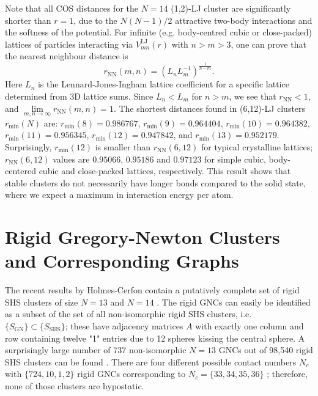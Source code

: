 Note that all \ac{COS} distances for the $N=14$ (1,2)-\ac{LJ} cluster are
significantly shorter than $r=1$, due to the $N(N-1)/2$ attractive two-body
interactions and the softness of the potential.  For infinite (e.g.
body-centred cubic or close-packed) lattices of particles interacting via
$V^\mathrm{LJ}_{mn}(r)$ with $n> m >3$, one can prove
\autocite{Schwerdtfeger_ExtensionLennardJonespotential_2006} that the nearest
neighbour distance is
%
\begin{equation}
    r_\mathrm{NN}(m,n)=\left( L_n L_m^{-1}\right)^\frac{1}{n-m}. %
    \label{eqn:lattice}
\end{equation}%
%
Here $L_n$ is the Lennard-Jones-Ingham lattice coefficient for a specific
lattice determined from 3D lattice sums.  Since $L_n<L_m$ for $n>m$, we see
that $r_\mathrm{NN}<1$, and $\lim\limits_{m,n\rightarrow
\infty}r_\mathrm{NN}(m,n)=1$.  The shortest distances found in (6,12)-\ac{LJ}
clusters $r_\text{min}(N)$ are: $r_\text{min}(8)=0.986767$,
$r_\text{min}(9)=0.964404$, $r_\text{min}(10)=0.964382$,
$r_\text{min}(11)=0.956345$, $r_\text{min}(12)=0.947842$, and
$r_\text{min}(13)=0.952179$.  Surprisingly, $r_\text{min}(12)$ is smaller than
$r_\mathrm{NN}(6,12)$ for typical crystalline lattices; $r_\mathrm{NN}(6,12)$
values are $0.95066$, $0.95186$ and $0.97123$ for simple cubic, body-centered
cubic and close-packed lattices, respectively.  This result shows that stable
clusters do not necessarily have longer bonds compared to the solid state,
where we expect a maximum in interaction energy per atom.

\section{Rigid Gregory-Newton Clusters and Corresponding Graphs}

The recent results by Holmes-Cerfon contain a putatively complete set of rigid
SHS clusters of size $N=13$ and $N=14$
\autocite{Holmes-Cerfon_EnumeratingRigidSphere_2016}. The rigid GNCs can easily
be identified as a subset of the set of all non-isomorphic rigid SHS clusters,
i.e. $\{ S_\mathrm{GN}\}\subset \{ S_\mathrm{SHS}\}$; these have adjacency
matrices $A$ with exactly one column and row containing twelve "1" entries due
to 12 spheres kissing the central sphere. A surprisingly large number of 737
non-isomorphic $N = 13$ GNCs out of 98,540 rigid SHS clusters can be found
\autocite{Trombach_stickyhardsphereLennardJonestypeclusters_2018}. There are
four different possible contact numbers $N_c$ with $\{724,10,1,2\}$ rigid GNCs
corresponding to $N_c=\{33,34,35,36\}$
\autocite{Robinson_Arrangement24points_1961}; therefore, none of those clusters
are hypostatic.

